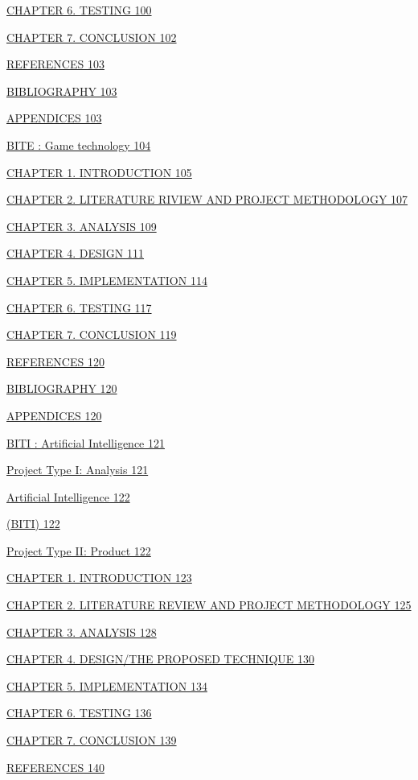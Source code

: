 \documentclass[12pt,a4paper]{article}
\begin{document}
\hyperref[_bookmark41]{CHAPTER 6. TESTING 100}

\hyperref[_bookmark42]{CHAPTER 7. CONCLUSION 102}

\hyperref[_bookmark43]{REFERENCES 103}

\hyperref[_bookmark44]{BIBLIOGRAPHY 103}

\hyperref[_bookmark45]{APPENDICES 103}

\hyperref[_bookmark46]{BITE : Game technology 104}

\hyperref[_bookmark47]{CHAPTER 1. INTRODUCTION 105}

\hyperref[_bookmark48]{CHAPTER 2. LITERATURE RIVIEW AND PROJECT
METHODOLOGY 107}

\hyperref[_bookmark49]{CHAPTER 3. ANALYSIS 109}

\hyperref[_bookmark50]{CHAPTER 4. DESIGN 111}

\hyperref[_bookmark51]{CHAPTER 5. IMPLEMENTATION 114}

\hyperref[_bookmark52]{CHAPTER 6. TESTING 117}

\hyperref[_bookmark53]{CHAPTER 7. CONCLUSION 119}

\hyperref[_bookmark54]{REFERENCES 120}

\hyperref[_bookmark55]{BIBLIOGRAPHY 120}

\hyperref[_bookmark56]{APPENDICES 120}

\hyperref[_bookmark57]{BITI : Artificial Intelligence 121}

\hyperref[_bookmark58]{Project Type I: Analysis 121}

\hyperref[_bookmark59]{Artificial Intelligence 122}

\hyperref[_bookmark60]{(BITI) 122}

\hyperref[_bookmark61]{Project Type II: Product 122}

\hyperref[_bookmark62]{CHAPTER 1. INTRODUCTION 123}

\hyperref[_bookmark63]{CHAPTER 2. LITERATURE REVIEW AND PROJECT
METHODOLOGY 125}

\hyperref[_bookmark64]{CHAPTER 3. ANALYSIS 128}

\hyperref[_bookmark65]{CHAPTER 4. DESIGN/THE PROPOSED TECHNIQUE 130}

\hyperref[_bookmark66]{CHAPTER 5. IMPLEMENTATION 134}

\hyperref[_bookmark67]{CHAPTER 6. TESTING 136}

\hyperref[_bookmark68]{CHAPTER 7. CONCLUSION 139}

\hyperref[_bookmark69]{REFERENCES 140}
\end{document}

